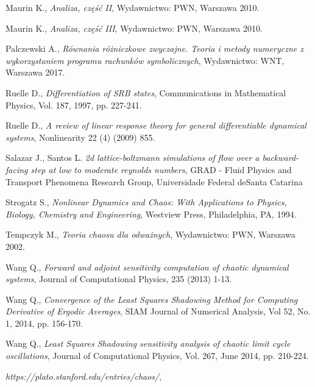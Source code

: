 \documentclass[12pt]{article}
\begin{document}
\begin{thebibliography}{99}
 Maurin K.,
\emph{Analiza, część II},
Wydawnictwo: PWN, Warszawa 2010.

 Maurin K.,
\emph{Analiza, część III},
Wydawnictwo: PWN, Warszawa 2010.

 Palczewski A.,
\emph{Równania różniczkowe zwyczajne. Teoria i metody numeryczne z wykorzystaniem programu rachunków symbolicznych},
Wydawnictwo: WNT, Warszawa 2017.

 Ruelle D.,
\emph{Differentiation of SRB states},
Communications in Mathematical Physics, Vol. 187, 1997, pp. 227-241.

 Ruelle D.,
\emph{ A review of linear response theory for general differentiable dynamical systems},
Nonlinearity 22 (4) (2009) 855.

 Salazar J., Santos L.
\emph{2d lattice-boltzmann simulations of flow over a backward-facing step at low to moderate reynolds numbers},
GRAD - Fluid Physics and Transport Phenomena Research Group, Universidade Federal deSanta Catarina
	
 Strogatz S., 
\emph{Nonlinear Dynamics and Chaos: With Applications to Physics, Biology, Chemistry and Engineering},
Westview Press, Philadelphia, PA, 1994.  

 Tempczyk M., 
\emph{Teoria chaosu dla odważnych},
Wydawnictwo: PWN, Warszawa 2002.
	
 Wang Q.,
\emph{Forward and adjoint sensitivity computation of chaotic dynamical systems},
Journal of Computational Physics, 235 (2013) 1-13.

 Wang Q.,
\emph{Convergence of the Least Squares Shadowing Method for Computing Derivative of Ergodic Averages},
SIAM Journal of Numerical Analysis, Vol 52, No. 1, 2014, pp. 156-170.  

 Wang Q., 
\emph{Least Squares Shadowing sensitivity analysis of chaotic limit cycle oscillations},
Journal of Computational Physics, Vol. 267, June 2014, pp. 210-224.  

\emph{https://plato.stanford.edu/entries/chaos/},
\end{thebibliography} 
\end{document}
